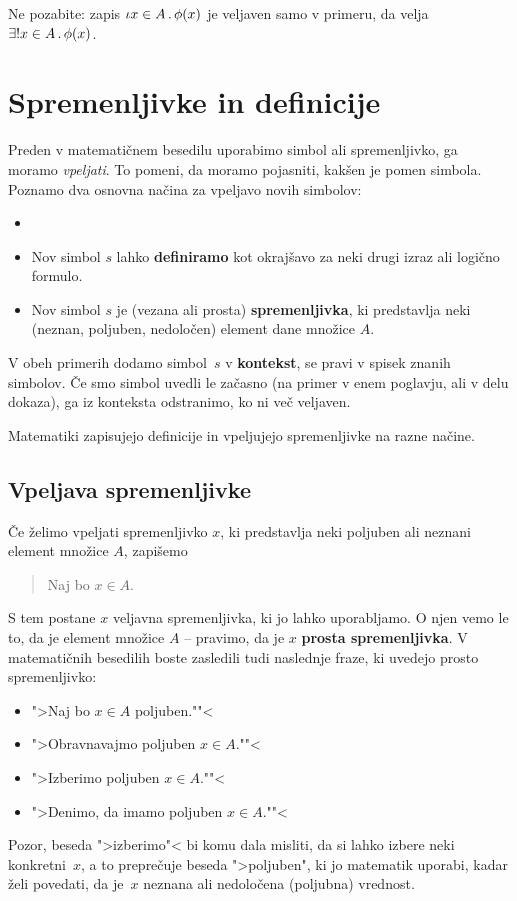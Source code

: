 \begin{opomba}
  Ne pozabite: zapis $\iota x \in A \,.\, \phi(x)$ je veljaven samo v primeru, da velja
  $\exists! x \in A \,.\, \phi(x)$.
\end{opomba}


\section{Spremenljivke in definicije}

Preden v matematičnem besedilu uporabimo simbol ali spremenljivko, ga moramo \emph{vpeljati}. To pomeni, da moramo pojasniti, kakšen je pomen simbola. Poznamo dva osnovna načina za vpeljavo novih simbolov:
%
\begin{itemize}
\item \item Nov simbol $s$ lahko \textbf{definiramo} kot okrajšavo za neki drugi izraz ali logično formulo.
\item Nov simbol $s$ je (vezana ali prosta) \textbf{spremenljivka}, ki predstavlja neki (neznan, poljuben, nedoločen) element dane množice $A$.
\end{itemize}
%
V obeh primerih dodamo simbol~$s$ v \textbf{kontekst}, se pravi v spisek znanih simbolov. Če smo simbol uvedli le začasno (na primer v enem poglavju, ali v delu dokaza), ga iz konteksta odstranimo, ko ni več veljaven.

Matematiki zapisujejo definicije in vpeljujejo spremenljivke na razne načine.

\subsection{Vpeljava spremenljivke}

Če želimo vpeljati spremenljivko $x$, ki predstavlja neki poljuben ali neznani element množice $A$, zapišemo
%
\begin{quote}
  Naj bo $x \in A$.
\end{quote}
%
S tem postane $x$ veljavna spremenljivka, ki jo lahko uporabljamo. O njen vemo le to, da je element množice $A$ -- pravimo, da je $x$ \textbf{prosta spremenljivka}. V matematičnih besedilih boste zasledili tudi naslednje fraze, ki uvedejo prosto spremenljivko:
%
\begin{itemize}
\item ">Naj bo $x \in A$ poljuben.""<
\item ">Obravnavajmo poljuben $x \in A$.""<
\item ">Izberimo poljuben $x \in A$.""<
\item ">Denimo, da imamo poljuben $x \in A$.""<
\end{itemize}
%
Pozor, beseda ">izberimo"< bi komu dala misliti, da si lahko izbere neki konkretni~$x$, a to preprečuje beseda ">poljuben", ki jo matematik uporabi, kadar želi povedati, da je~$x$ neznana ali nedoločena (poljubna) vrednost.

